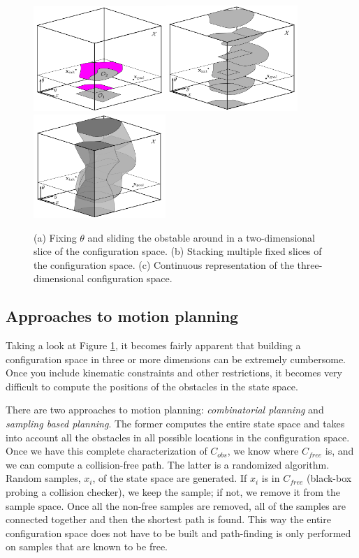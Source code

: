\documentclass[twoside]{article}
\begin{document}
\begin{figure}[h!]
  \centering
  \includegraphics[width=50mm]{3Dslide1.PNG}\includegraphics[width=50mm]{3Dslide2.PNG}\includegraphics[width=50mm]{3Dslide3.PNG}
  \caption{(a) Fixing $\theta$ and sliding the obstable around in a two-dimensional slice of the configuration space. (b) Stacking multiple fixed slices of the configuration space. (c) Continuous representation of the three-dimensional configuration space.}
  \label{fig:3Dslide}
\end{figure}

\subsection{Approaches to motion planning}

Taking a look at Figure \ref{fig:3Dslide}, it becomes fairly apparent that building a configuration space in three or more dimensions can be extremely cumbersome. Once you include kinematic constraints and other restrictions, it becomes very difficult to compute the positions of the obstacles in the state space. 

There are two approaches to motion planning: \textit{combinatorial planning} and \textit{sampling based planning}. The former computes the entire state space and takes into account all the obstacles in all possible locations in the configuration space. Once we have this complete characterization of $C_{obs}$, we know where $C_{free}$ is, and we can compute a collision-free path. The latter is a randomized algorithm. Random samples, $x_i$, of the state space are generated. If $x_i$ is in $C_{free}$ (black-box probing a collision checker), we keep the sample; if not, we remove it from the sample space. Once all the non-free samples are removed, all of the samples are connected together and then the shortest path is found. This way the entire configuration space does not have to be built and path-finding is only performed on samples that are known to be free.
\end{document}
